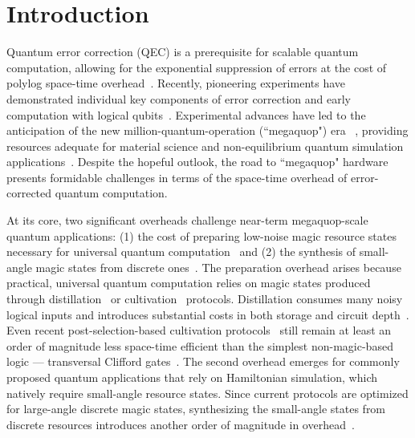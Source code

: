 \documentclass[aps, prx, reprint, superscriptaddress, longbibliography, floatfix]{revtex4-2}
\begin{document}
\section{Introduction} 
\label{sec:intro}

Quantum error correction (QEC) is a prerequisite for scalable quantum computation, allowing for the exponential suppression of errors at the cost of polylog space-time overhead~\cite{Shor1996, Campbell2017}. Recently, pioneering experiments have demonstrated individual key components of error correction and early computation with logical qubits~\cite{Bluvstein2024, Rodriguez2024, Paetznick2024, Vandam2024, Acharya2025, Bluvstein2025b}. Experimental advances have led to the anticipation of the new million-quantum-operation (``megaquop") era ~\cite{Preskill2018, Preskill2025}, providing resources adequate for material science and non-equilibrium quantum simulation applications~\cite{Campbell2021, Daley2022, Lin2022, Weiss2024}. Despite the hopeful outlook, the road to ``megaquop" hardware presents formidable challenges in terms of the space-time overhead of error-corrected quantum computation. 

At its core, two significant overheads challenge near-term megaquop-scale quantum applications: (1) the cost of preparing low-noise magic resource states necessary for universal quantum computation~\cite{Zhou2000, Eastin2009, Yoder2016, Campbell2017, Beverland2021} and (2) the synthesis of small-angle magic states from discrete ones~\cite{Ross2016, Kliuchnikov2016, Yin2025}. The preparation overhead arises because practical, universal quantum computation relies on magic states produced through distillation~\cite{Bravyi2005} or cultivation~\cite{Gidney2024, Chen2025} protocols. Distillation consumes many noisy logical inputs and introduces substantial costs in both storage and circuit depth~\cite{Zhou2000, Eastin2009, Yoder2016, Campbell2017, Beverland2021, Bravyi2005}. Even recent post-selection-based cultivation protocols~\cite{Gidney2024, Chen2025} still remain at least an order of magnitude less space-time efficient than the simplest non-magic-based logic --- transversal Clifford gates~\cite{Bravyi2013, Zhou2024}. The second overhead emerges for commonly proposed quantum applications that rely on Hamiltonian simulation, which natively require small-angle resource states. Since current protocols are optimized for large-angle discrete magic states, synthesizing the small-angle states from discrete resources introduces another order of magnitude in overhead~\cite{Ross2016, Kliuchnikov2016, Yin2025}.
\end{document}
